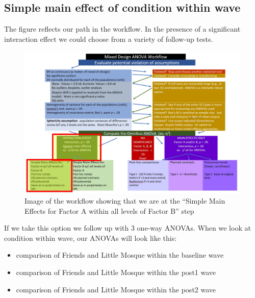 \documentclass[
  11pt,
]{book}
\providecommand{\tightlist}{%
  \setlength{\itemsep}{0pt}\setlength{\parskip}{0pt}}
\begin{document}
\hypertarget{simple-main-effect-of-condition-within-wave}{%
\subsection{Simple main effect of condition within wave}\label{simple-main-effect-of-condition-within-wave}}

The figure reflects our path in the workflow. In the presence of a significant interaction effect we could choose from a variety of follow-up tests.

\begin{figure}
\centering
\includegraphics{images/mixed/mx_SimpleMainA.jpg}
\caption{Image of the workflow showing that we are at the ``Simple Main Effects for Factor A within all levels of Factor B'' step}
\end{figure}

If we take this option we follow up with 3 one-way ANOVAs. When we look at condition within wave, our ANOVAs will look like this:

\begin{itemize}
\tightlist
\item
  comparison of Friends and Little Mosque within the baseline wave
\item
  comparison of Friends and Little Mosque within the post1 wave
\item
  comparison of Friends and Little Mosque within the post2 wave
\end{itemize}
\end{document}
